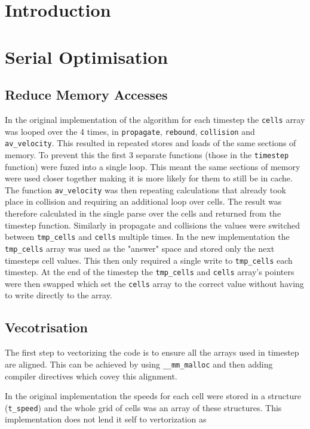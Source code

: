 \documentclass{article}
\begin{document}
\begin{multicols}{2}

\section{Introduction}

\section{Serial Optimisation}

\subsection{Reduce Memory Accesses}
In the original implementation of the algorithm for each timestep the
\verb|cells| array was looped over the 4 times, in \verb|propagate|,
\verb|rebound|, \verb|collision| and \verb|av_velocity|. This resulted in
repeated stores and loads of the same sections of memory. To prevent this the
first 3 separate functions (those in the \verb|timestep| function) were fuzed
into a single loop. This meant the same sections of memory were used closer
together making it is more likely for them to still be in cache. The function
\verb|av_velocity| was then repeating calculations that already took place in
collision and requiring an additional loop over cells. The result was therefore
calculated in the single parse over the cells and returned from the timestep
function. Similarly in propagate and collisions the values were switched
between \verb|tmp_cells| and \verb|cells| multiple times. In the new
implementation the \verb|tmp_cells| array was used as the "answer" space and
stored only the next timesteps cell values. This then only required a single
write to \verb|tmp_cells| each timestep. At the end of the timestep the
\verb|tmp_cells| and \verb|cells| array's pointers were then swapped which set
the \verb|cells| array to the correct value without having to write directly to
the array.

\subsection{Vecotrisation}

The first step to vectorizing the code is to ensure all the arrays used in
timestep are aligned. This can be achieved by using \verb|__mm_malloc| and then
adding compiler directives which covey this alignment.

In the original implementation the speeds for each cell were stored in a structure (\verb|t_speed|) and the whole grid of cells was an array of these structures. This implementation does not lend it self to vertorization as 


\end{multicols}
\end{document}

